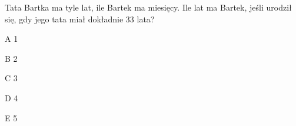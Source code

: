 \begin{tresc}
Tata Bartka ma tyle lat, ile Bartek ma miesięcy. Ile lat ma Bartek, jeśli urodził się, gdy jego tata miał dokładnie 33 lata?
\end{tresc}
\begin{wariant}{A} 1 \end{wariant}
\begin{wariant}{B} 2 \end{wariant}
\begin{wariant}{C} 3 \end{wariant}
\begin{wariant}{D} 4 \end{wariant}
\begin{wariant}{E} 5 \end{wariant}
